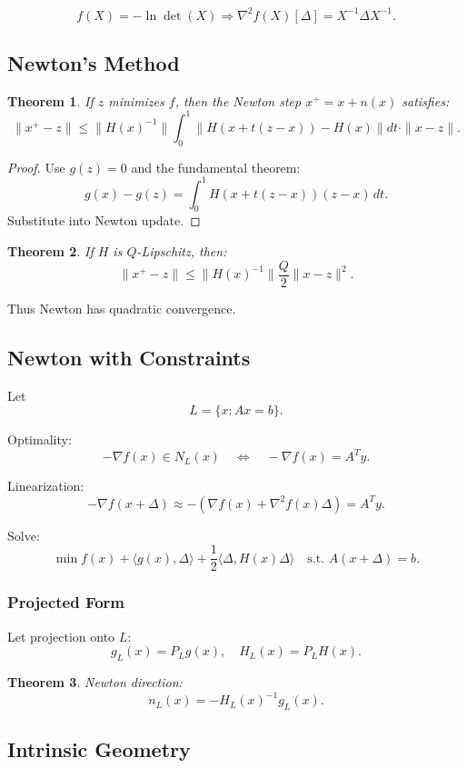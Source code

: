 \documentclass[12pt,oneside]{book}
\numberwithin{equation}{section}
\theoremstyle{definition}
\theoremstyle{plain}
\newtheorem{theorem}{Theorem}[section]
\theoremstyle{remark}
\begin{document}
\[
f(X) = -\ln \det(X)
\Rightarrow
\nabla^2 f(X)[\Delta] = X^{-1} \Delta X^{-1}.
\]

\subsection{Newton's Method}

\begin{theorem}
If $z$ minimizes $f$, then the Newton step $x^+ = x + n(x)$ satisfies:
\[
\|x^+ - z\|
\le
\|H(x)^{-1}\|
\int_0^1
\|H(x + t(z-x)) - H(x)\| dt
\cdot \|x - z\|.
\]
\end{theorem}

\begin{proof}
Use $g(z)=0$ and the fundamental theorem:
\[
g(x) - g(z)
= \int_0^1 H(x+t(z-x))(z-x)\,dt.
\]
Substitute into Newton update.
\end{proof}

\begin{theorem}
If $H$ is $Q$-Lipschitz, then:
\[
\|x^+ - z\|
\le
\|H(x)^{-1}\| \frac{Q}{2} \|x-z\|^2.
\]
\end{theorem}

\noindent
Thus Newton has quadratic convergence.

\subsection{Newton with Constraints}

Let
\[
L = \{x : Ax = b\}.
\]

Optimality:
\[
-\nabla f(x) \in N_L(x)
\quad \Longleftrightarrow \quad
-\nabla f(x) = A^T y.
\]

Linearization:
\[
-\nabla f(x+\Delta)
\approx
-(\nabla f(x) + \nabla^2 f(x)\Delta)
= A^T y.
\]

Solve:
\[
\min f(x) + \langle g(x),\Delta \rangle + \frac{1}{2}\langle \Delta, H(x)\Delta \rangle
\quad \text{s.t. } A(x+\Delta)=b.
\]

\subsubsection*{Projected Form}

Let projection onto $L$:
\[
g_L(x) = P_L g(x),
\quad
H_L(x) = P_L H(x).
\]

\begin{theorem}
Newton direction:
\[
n_L(x) = -H_L(x)^{-1} g_L(x).
\]
\end{theorem}

\subsection*{Intrinsic Geometry}
\end{document}
